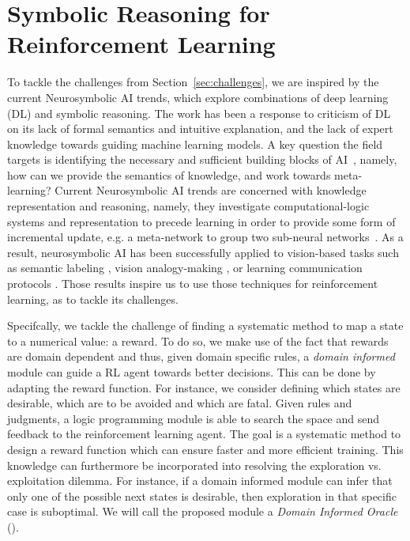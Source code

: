 \section{Symbolic Reasoning for Reinforcement Learning} 
\label{symrl}

To tackle the challenges from Section~\ref{sec:challenges}, we are
inspired by the current Neurosymbolic AI trends, which explore
combinations of deep learning (DL) and symbolic reasoning.
%
The work has been a response to criticism of DL on its lack of formal
semantics and intuitive explanation, and the lack of expert knowledge
towards guiding machine learning models.
%
A key question the field targets is identifying the necessary and
sufficient building blocks of AI~\cite{garcez2020neurosymbolic},
namely, how can we provide the semantics of knowledge, and work
towards meta-learning? 
%
Current Neurosymbolic AI trends are concerned with knowledge representation and reasoning, namely, they investigate computational-logic systems 
and representation to precede learning in order to provide some form
of incremental update, e.g. a meta-network to group two sub-neural
networks~\cite{Besold2017NeuralSymbolicLA}.
As a result, neurosymbolic AI has been successfully applied to vision-based tasks such as semantic labeling \cite{vinyals2015, karpathy2015}, 
vision analogy-making \cite{Reed2015DeepVA}, or learning communication
protocols \cite{Foerster2016LearningTC}.
Those results inspire us to use those techniques for reinforcement learning, as to tackle its challenges.

\medskip
Specifcally, we tackle the challenge of finding a systematic method to map a state to a numerical value: a reward. 
To do so, we make use of the fact that rewards are domain dependent and thus, given domain specific rules, a \emph{domain informed} module can guide a RL agent towards better decisions. This can be done by 
adapting the reward function. For instance, we consider defining which states are desirable, which are to be avoided and which are fatal. Given rules and judgments, a logic programming module 
is able to search the space and send feedback to the reinforcement learning agent. The goal is a systematic method to design a reward function which can ensure faster and more efficient 
training. This knowledge can furthermore be incorporated into resolving the exploration vs. exploitation dilemma. For instance, if a domain informed module 
can infer that only one of the possible next states is desirable, then exploration in that specific case is suboptimal.  
We will call the proposed module a \emph{Domain Informed Oracle}
(\dio{}).

